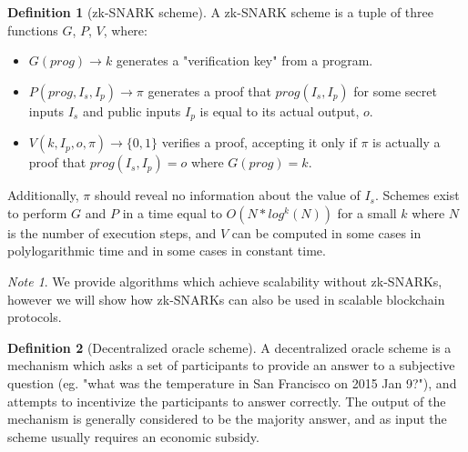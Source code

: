 \documentclass[11pt,a4paper]{report}
\theoremstyle{plain}
\theoremstyle{definition}
\newtheorem{defn}{Definition}[chapter]
\theoremstyle{remark}
\newtheorem*{note}{Note}
\begin{document}
\begin{defn}[zk-SNARK scheme]
A zk-SNARK scheme is a tuple of three functions $G$, $P$, $V$, where:
\begin{itemize}
\item
$G(prog) \rightarrow k$ generates a "verification key" from a program.
\item
$P(prog, I_s, I_p) \rightarrow \pi$ generates a proof that $prog(I_s, I_p)$ for some secret inputs $I_s$ and public inputs $I_p$ is equal to its actual output, $o$.
\item
$V(k, I_p, o, \pi) \rightarrow \{0, 1\}$ verifies a proof, accepting it only if $\pi$ is actually a proof that $prog(I_s, I_p) = o$ where $G(prog) = k$.
\end{itemize}
Additionally, $\pi$ should reveal no information about the value of $I_s$. Schemes exist \cite{snark} to perform $G$ and $P$ in a time equal to $O(N*log^k(N))$ for a small $k$ where $N$ is the number of execution steps, and $V$ can be computed in some cases in polylogarithmic time and in some cases in constant time.
\end{defn}

\begin{note}
We provide algorithms which achieve scalability without zk-SNARKs, however we will show how zk-SNARKs can also be used in scalable blockchain protocols.
\end{note}

\begin{defn}[Decentralized oracle scheme]
A decentralized oracle scheme is a mechanism which asks a set of participants to provide an answer to a subjective question (eg. "what was the temperature in San Francisco on 2015 Jan 9?"), and attempts to incentivize the participants to answer correctly. The output of the mechanism is generally considered to be the majority answer, and as input the scheme usually requires an economic subsidy.
\end{defn}
\end{document}
